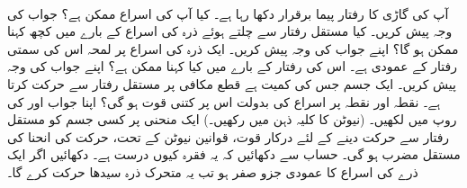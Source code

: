\\
آپ کی گاڑی کا  رفتار پیما  برقرار  دکھا رہا ہے۔ کیا آپ کی اسراع ممکن ہے؟ جواب کی وجہ پیش کریں۔
کیا مستقل رفتار سے  چلتے ہوئے ذرہ کی اسراع کے بارے میں کچھ کہنا ممکن ہو گا؟ اپنے جواب کی وجہ پیش کریں۔ 
ایک ذرہ کی اسراع پر لمحہ  اس کی  سمتی رفتار کے عمودی ہے۔ اس کی رفتار کے بارے میں کیا کہنا ممکن ہے؟ اپنے جواب کی وجہ پیش کریں۔
ایک جسم جس کی کمیت  ہے قطع مکافی  پر مستقل رفتار  سے حرکت کرتا ہے۔ نقطہ  اور نقطہ   پر اسراع کی بدولت اس پر کتنی قوت ہو گی؟  اپنا جواب  اور  کی روپ میں لکھیں۔ (نیوٹن کا کلیہ  ذہن میں رکھیں۔)
ایک منحنی پر کسی جسم کو مستقل رفتار  سے حرکت دینے کے لئے درکار قوت، قوانین نیوٹن کے تحت، حرکت کی انحنا کی مستقل مضرب ہو گی۔ حساب  سے دکھائیں کہ یہ فقرہ کیوں درست ہے۔
دکھائیں اگر ایک ذرے کی  اسراع کا عمودی جزو صفر ہو  تب یہ متحرک ذرہ سیدھا  حرکت کرے  گا۔

